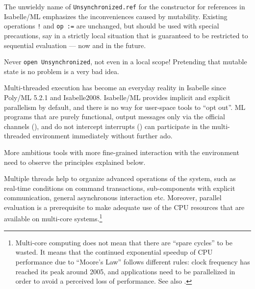 \begin{isabellebody}
\begin{isamarkuptext}
  The unwieldy name of \verb|Unsynchronized.ref| for the constructor
  for references in Isabelle/ML emphasizes the inconveniences caused by
  mutability.  Existing operations \verb|!|  and \verb|op :=| are
  unchanged, but should be used with special precautions, say in a
  strictly local situation that is guaranteed to be restricted to
  sequential evaluation --- now and in the future.

  \begin{warn}
  Never \verb|open Unsynchronized|, not even in a local scope!
  Pretending that mutable state is no problem is a very bad idea.
  \end{warn}%
\end{isamarkuptext}%
\isamarkuptrue%
%
\isamarkuptrue%
%
\begin{isamarkuptext}%
Multi-threaded execution has become an everyday reality in
  Isabelle since Poly/ML 5.2.1 and Isabelle2008.  Isabelle/ML provides
  implicit and explicit parallelism by default, and there is no way
  for user-space tools to ``opt out''.  ML programs that are purely
  functional, output messages only via the official channels
  (), and do not intercept interrupts
  () can participate in the multi-threaded
  environment immediately without further ado.

  More ambitious tools with more fine-grained interaction with the
  environment need to observe the principles explained below.%
\end{isamarkuptext}%
\isamarkuptrue%
%
\isamarkuptrue%
%
\begin{isamarkuptext}%
Multiple threads help to organize advanced operations of the
  system, such as real-time conditions on command transactions,
  sub-components with explicit communication, general asynchronous
  interaction etc.  Moreover, parallel evaluation is a prerequisite to
  make adequate use of the CPU resources that are available on
  multi-core systems.\footnote{Multi-core computing does not mean that
  there are ``spare cycles'' to be wasted.  It means that the
  continued exponential speedup of CPU performance due to ``Moore's
  Law'' follows different rules: clock frequency has reached its peak
  around 2005, and applications need to be parallelized in order to
  avoid a perceived loss of performance.  See also
  \cite{Sutter:2005}.}


\end{isamarkuptext}
\end{isabellebody}
